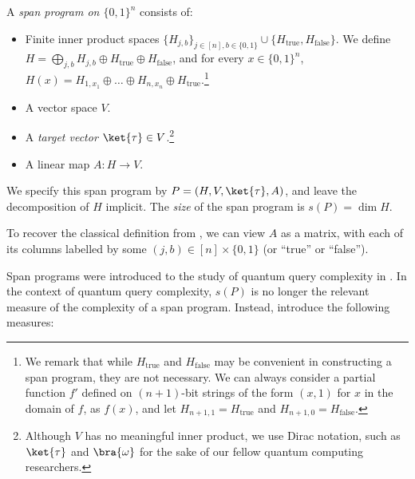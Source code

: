 \documentclass{toc}
\begin{document}
\begin{definition}\label{def:span}
A \emph{span program on $\{0,1\}^n$} consists of:
\begin{itemize}
\item Finite inner product spaces $\{H_{j,b}\}_{j\in [n],b\in\{0,1\}}\cup\{H_{\mathrm{true}},H_{\mathrm{false}}\}$. We define $H=\bigoplus_{j,b}H_{j,b}\oplus H_{\mathrm{true}}\oplus H_{\mathrm{false}}$, and for every $x\in\{0,1\}^n$, $H(x)=H_{1,x_1}\oplus\dots\oplus H_{n,x_n}\oplus H_\mathrm{true}$.\footnote{We remark that while $H_{\mathrm{true}}$ and $H_{\mathrm{false}}$ may be convenient in constructing a span program, they are not necessary. We can always consider a partial function $f'$ defined on $(n+1)$-bit strings of the form $(x,1)$ for $x$ in the domain of $f$, as $f(x)$, and let $H_{n+1,1}=H_{\mathrm{true}}$ and $H_{n+1,0}=H_{\mathrm{false}}$.} 
\item A vector space $V$.
\item A \emph{target vector} $\ket{\tau}\in V$.\footnote{Although $V$ has no meaningful inner product, we use Dirac notation, such as $\ket{\tau}$ and $\bra{\omega}$ for the sake of our fellow quantum computing researchers.}
\item A linear map $A:H\rightarrow V$.
\end{itemize}
We specify this span program by $P=(H,V,\ket{\tau},A)$, and leave the decomposition of $H$ implicit. The \emph{size} of the span program is $s(P)=\dim H$. 
\end{definition}

To recover the classical definition from \cite{KW93}, we can view $A$ as a matrix, with each of its columns labelled by some $(j,b)\in [n]\times \{0,1\}$ (or ``true'' or ``false''). 


Span programs were introduced to the study of quantum query complexity in \cite{RS12}. In the context of quantum query complexity, $s(P)$ is no longer the relevant measure of the complexity of a span program. Instead, \cite{RS12} introduce the following measures:
\end{document}

